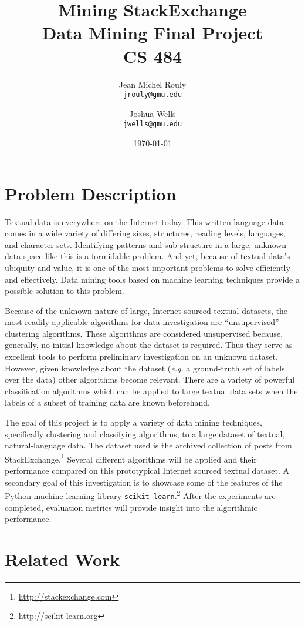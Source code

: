 \documentclass[letterpaper,10pt]{article}
\title{
  \Huge\textbf{Mining StackExchange} \\
  \LARGE Data Mining Final Project \\
  CS 484 \\
}
\author{
  Jean Michel Rouly\\
  \texttt{jrouly@gmu.edu}
  \and
  Joshua Wells\\
  \texttt{jwells@gmu.edu}
}
\date{\today}
\begin{document}
\maketitle


\section{Problem Description}

Textual data is everywhere on the Internet today. This written language
data comes in a wide variety of differing sizes, structures, reading
levels, languages, and character sets. Identifying patterns and
sub-structure in a large, unknown data space like this is a formidable
problem. And yet, because of textual data's ubiquity and value, it is one
of the most important problems to solve efficiently and effectively. Data
mining tools based on machine learning techniques provide a possible
solution to this problem.

Because of the unknown nature of large, Internet sourced textual
datasets, the most readily applicable algorithms for data investigation
are ``unsupervised'' clustering algorithms. These algorithms are
considered unsupervised because, generally, no initial knowledge about
the dataset is required. Thus they serve as excellent tools to perform
preliminary investigation on an unknown dataset. However, given knowledge
about the dataset (\textit{e.g.} a ground-truth set of labels over the
data) other algorithms become relevant. There are a variety of powerful
classification algorithms which can be applied to large textual data sets
when the labels of a subset of training data are known beforehand.

The goal of this project is to apply a variety of data mining techniques,
specifically clustering and classifying algorithms, to a large dataset of
textual, natural-language data. The dataset used is the archived
collection of posts from
StackExchange.\footnote{\url{http://stackexchange.com}} Several different
algorithms will be applied and their performance compared on this
prototypical Internet sourced textual dataset. A secondary goal of this
investigation is to showcase some of the features of the Python machine
learning library
\texttt{scikit-learn}.\footnote{\url{http://scikit-learn.org}} After the
experiments are completed, evaluation metrics will provide insight into
the algorithmic performance.


\section{Related Work}
\end{document}
